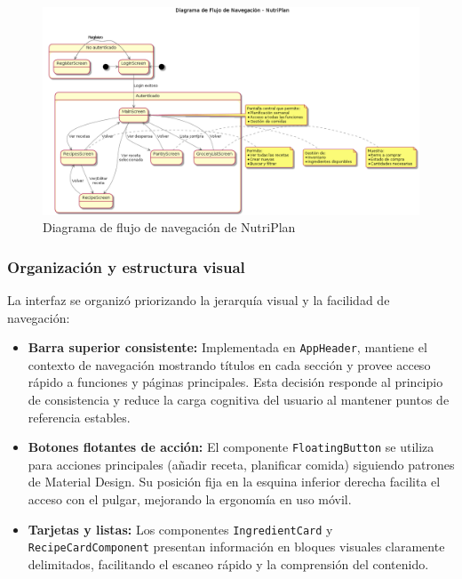 \documentclass[twoside, openright, 11pt]{report}
\begin{document}
		\begin{figure}[H]
			\centering
			\includegraphics[width=\textwidth]{imagenes/navigation_flow}
			\caption{Diagrama de flujo de navegación de NutriPlan}
			\label{fig:navigation_flow}
		\end{figure}
		
		\subsubsection*{Organización y estructura visual}
		La interfaz se organizó priorizando la jerarquía visual y la facilidad de navegación:
		
		\begin{itemize}
			\item \textbf{Barra superior consistente:} Implementada en \texttt{AppHeader}, mantiene el contexto de navegación mostrando títulos en cada sección y provee acceso rápido a funciones y páginas principales. Esta decisión responde al principio de consistencia y reduce la carga cognitiva del usuario al mantener puntos de referencia estables.
			
			\item \textbf{Botones flotantes de acción:} El componente \texttt{FloatingButton} se utiliza para acciones principales (añadir receta, planificar comida) siguiendo patrones de Material Design. Su posición fija en la esquina inferior derecha facilita el acceso con el pulgar, mejorando la ergonomía en uso móvil.
			
			\item \textbf{Tarjetas y listas:} Los componentes \texttt{IngredientCard} y \texttt{RecipeCardComponent} presentan información en bloques visuales claramente delimitados, facilitando el escaneo rápido y la comprensión del contenido.
		\end{itemize}
		
\end{document}
